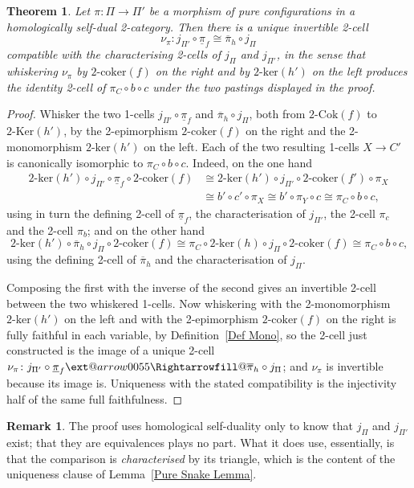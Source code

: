 \documentclass[reqno,a4paper]{amsart}
\makeatletter
\numberwithin{equation}{section}
\theoremstyle{plain}
\newtheorem{theorem}[subsection]{Theorem}
\theoremstyle{definition}
\newtheorem{remark}[subsection]{Remark}
\def\nameit#1{\textrm{#1}~}
\def\lemx{\nameit{Lemma}}
\def\defx{\nameit{Definition}}
\newcommand{\comp}{\circ}
\newcommand{\iso}{\cong}
\newcommand{\ov}[1]{\overline{#1}}
\renewcommand{\1}{\onecat{1}}
\newcommand{\TwoKer}{\ensuremath{2\text{-}\mathrm{Ker}}}
\newcommand{\TwoCoker}{\ensuremath{2\text{-}\mathrm{Cok}}}
\newcommand{\twoker}{\ensuremath{2\text{-}\mathrm{ker}}}
\newcommand{\twocoker}{\ensuremath{2\text{-}\mathrm{coker}}}
\newcommand{\aR}[2][]{%
	\ext@arrow 0055{\Rightarrowfill@}{#1}{#2}}
\makeatother
\begin{document}
\begin{theorem}\label{T:NaturalComparison}
	Let \(\pi\colon\Pi\to\Pi'\) be a morphism of pure configurations in a homologically self-dual 2-category. Then there is a unique invertible 2-cell
	\[
		\nu_\pi\colon j_{\Pi'}\comp\underline{\pi}_f\iso\ov{\pi}_h\comp j_\Pi
	\]
	compatible with the characterising 2-cells of \(j_\Pi\) and \(j_{\Pi'}\), in the sense that whiskering \(\nu_\pi\) by \(\twocoker(f)\) on the right and by \(\twoker(h')\) on the left produces the identity 2-cell of \(\pi_C\comp b\comp c\) under the two pastings displayed in the proof.
\end{theorem}
\begin{proof}
	Whisker the two 1-cells \(j_{\Pi'}\comp\underline{\pi}_f\) and \(\ov{\pi}_h\comp j_\Pi\), both from \(\TwoCoker(f)\) to \(\TwoKer(h')\), by the 2-epimorphism \(\twocoker(f)\) on the right and the 2-monomorphism \(\twoker(h')\) on the left. Each of the two resulting 1-cells \(X\to C'\) is canonically isomorphic to \(\pi_C\comp b\comp c\). Indeed, on the one hand
	\begin{align*}
		\twoker(h')\comp j_{\Pi'}\comp\underline{\pi}_f\comp\twocoker(f)
		 & \iso\twoker(h')\comp j_{\Pi'}\comp\twocoker(f')\comp\pi_X \\
		 & \iso b'\comp c'\comp\pi_X
		\iso b'\comp\pi_Y\comp c
		\iso\pi_C\comp b\comp c\text{,}
	\end{align*}
	using in turn the defining 2-cell of \(\underline{\pi}_f\), the characterisation of \(j_{\Pi'}\), the 2-cell \(\pi_c\) and the 2-cell \(\pi_b\); and on the other hand
	\[
		\twoker(h')\comp\ov{\pi}_h\comp j_\Pi\comp\twocoker(f)
		\iso\pi_C\comp\twoker(h)\comp j_\Pi\comp\twocoker(f)
		\iso\pi_C\comp b\comp c\text{,}
	\]
	using the defining 2-cell of \(\ov{\pi}_h\) and the characterisation of \(j_\Pi\).

	Composing the first with the inverse of the second gives an invertible 2-cell between the two whiskered 1-cells. Now whiskering with the 2-monomorphism \(\twoker(h')\) on the left and with the 2-epimorphism \(\twocoker(f)\) on the right is fully faithful in each variable, by \defx\ref{Def Mono}, so the 2-cell just constructed is the image of a unique 2-cell \(\nu_\pi\colon j_{\Pi'}\comp\underline{\pi}_f\aR{}\ov{\pi}_h\comp j_\Pi\); and \(\nu_\pi\) is invertible because its image is. Uniqueness with the stated compatibility is the injectivity half of the same full faithfulness.
\end{proof}

\begin{remark}\label{Rem Natural Comparison Cost}
	The proof uses homological self-duality only to know that \(j_\Pi\) and \(j_{\Pi'}\) exist; that they are equivalences plays no part. What it does use, essentially, is that the comparison is \emph{characterised} by its triangle, which is the content of the uniqueness clause of \lemx\ref{Pure Snake Lemma}.
\end{remark}
\end{document}
